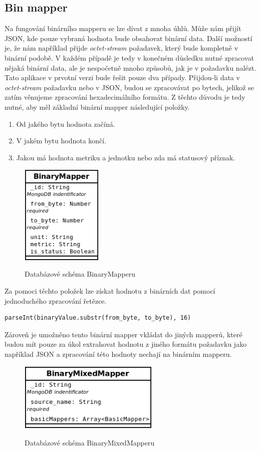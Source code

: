 \documentclass[thesis=M,czech]{FITthesis}[2018/10/20]
\begin{document}
\subsection{Bin mapper}
Na fungování binárního mapperu se lze dívat z mnoha úhlů. Může nám přijít JSON, kde pouze vybraná hodnota bude obsahovat binární data. Další možností je, že nám například přijde \textit{octet-stream} požadavek, který bude kompletně v binární podobě.
V každém případě je tedy v konečném důsledku nutné zpracovat nějaká binární data, ale je nespočetně mnoho způsobů, jak je v požadavku nalézt. Tato aplikace v prvotní verzi bude řešit pouze dva případy. Přijdou-li data v \textit{octet-stream} požadavku nebo v JSON, budou se zpracovávat po bytech, jelikož se zatím věnujeme zpracování hexadecimálního formátu. Z těchto důvodu je tedy nutné, aby měl základní binární mapper následující položky.
\begin{enumerate}
\item Od jakého bytu hodnota začíná.
\item V jakém bytu hodnota končí.
\item Jakou má hodnota metriku a jednotku nebo zda má statusový příznak.
\end{enumerate}

\begin{figure}[h]
\caption{Databázové schéma BinaryMapperu}
\centering
\includegraphics[width=0.35\textwidth]{diagrams/binaryMapper}
\label{fig:binaryMapper_schema}
\end{figure}
\newpage
Za pomoci těchto položek lze získat hodnotu z binárních dat pomocí jednoduchého zpracování řetězce. 
\begin{lstlisting}
parseInt(binaryValue.substr(from_byte, to_byte), 16)
\end{lstlisting}

Zároveň je umožněno tento binární mapper vkládat do jiných mapperů, které budou mít pouze za úkol extrahovat hodnotu z jiného formátu požadavku jako například JSON a zpracování této hodnoty nechají na binárním mapperu. 
\begin{figure}[h]
\caption{Databázové schéma BinaryMixedMapperu}
\centering
\includegraphics[width=0.60\textwidth]{diagrams/binaryMixedMapper}
\label{fig:binaryMixedMapper_schema}
\end{figure}
\end{document}
